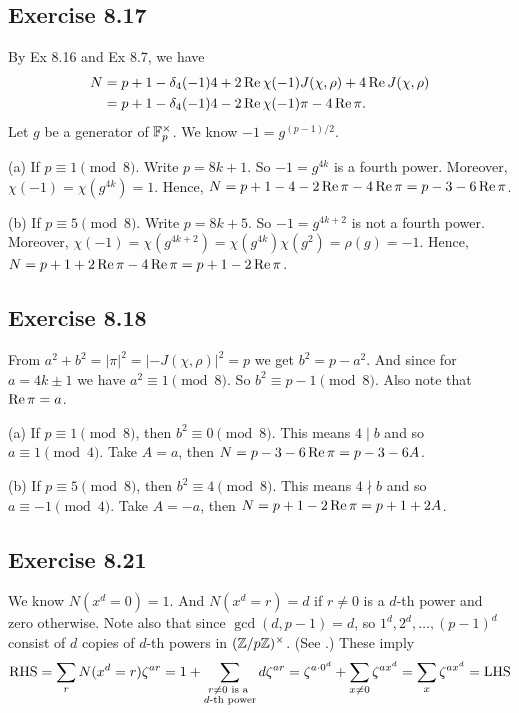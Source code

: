 \documentclass[../I&R.tex]{subfiles}
\begin{document}
\subsection*{Exercise 8.17}

By Ex 8.16 and Ex 8.7, we have
\begin{align*}
N &= p+1-\delta_4(-1)4+2\operatorname{Re}\chi(-1)J(\chi,\rho)+4\operatorname{Re} J(\chi,\rho) \\
&= p+1-\delta_4(-1)4-2\operatorname{Re}\chi(-1)\pi-4\operatorname{Re}\pi.
\end{align*}
Let $g$ be a generator of $\mathbb{F}_p^\times$. We know $-1=g^{(p-1)/2}$.

(a) If $p\equiv1\pmod{8}$. Write $p=8k+1$. So $-1=g^{4k}$ is a fourth power. Moreover, $\chi(-1)=\chi(g^{4k})=1$. Hence, $N=p+1-4-2\operatorname{Re}\pi-4\operatorname{Re}\pi=p-3-6\operatorname{Re}\pi$.

(b) If $p\equiv5\pmod{8}$. Write $p=8k+5$. So $-1=g^{4k+2}$ is not a fourth power. Moreover, $\chi(-1)=\chi(g^{4k+2})=\chi(g^{4k})\chi(g^2)=\rho(g)=-1$. Hence, $N=p+1+2\operatorname{Re}\pi-4\operatorname{Re}\pi=p+1-2\operatorname{Re}\pi$.

\subsection*{Exercise 8.18}

From $a^2+b^2=|\pi|^2=|-J(\chi,\rho)|^2=p$ we get $b^2=p-a^2$. And since for $a=4k\pm1$ we have $a^2\equiv1\pmod{8}$. So $b^2\equiv p-1\pmod{8}$. Also note that $\operatorname{Re}\pi=a$.

(a) If $p\equiv1\pmod{8}$, then $b^2\equiv0\pmod{8}$. This means $4\mid b$ and so $a\equiv 1\pmod{4}$. Take $A=a$, then $N=p-3-6\operatorname{Re}\pi=p-3-6A$.

(b) If $p\equiv5\pmod{8}$, then $b^2\equiv4\pmod{8}$. This means $4\nmid b$ and so $a\equiv-1\pmod{4}$. Take $A=-a$, then $N=p+1-2\operatorname{Re}\pi=p+1+2A$.

\subsection*{Exercise 8.21}

We know $N(x^d=0)=1$. And $N(x^d=r)=d$ if $r\neq0$ is a $d$-th power and zero otherwise. Note also that since $\gcd(d,p-1)=d$, so $1^d,2^d,\ldots,(p-1)^d$ consist of $d$ copies of $d$-th powers in $(\mathbb{Z}/p\mathbb{Z})^\times$. (See .) These imply $$\operatorname{RHS}=\sum_r N(x^d=r)\zeta^{ar} = 1+\sum_{\substack{r\neq0 \text{ is a } \\ d\text{-th power}}} d\zeta^{ar} = \zeta^{a\cdot0^d} + \sum_{x\neq0} \zeta^{ax^d} = \sum_x \zeta^{ax^d} = \operatorname{LHS}$$
\end{document}
